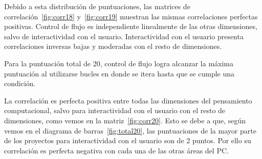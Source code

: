 \documentclass[a4paper, 12pt]{book}
\begin{document}
Debido a esta distribución de puntuaciones, las matrices de correlación~\ref{fig:corr18} y~\ref{fig:corr19} muestran las mismas correlaciones perfectas positivas. Control de flujo es independiente linealmente de las otras dimensiones, salvo de interactividad con el usuario. Interactividad con el usuario presenta correlaciones inversas bajas y moderadas con el resto  de dimensiones.

Para la puntuación total de 20, control de flujo logra alcanzar la máxima puntuación al utilizarse bucles en donde se itera hasta que se cumple una condición.

La correlación es perfecta positiva entre todas las dimensiones del pensamiento computacional, salvo para interactividad con el usuario con el resto de dimensiones, como vemos en la matriz~\ref{fig:corr20}. Esto se debe a que, según vemos en el diagrama de barras~\ref{fig:total20}, las puntuaciones de la mayor parte de los proyectos para interactividad con el usuario son de 2 puntos. Por ello su correlación es perfecta negativa con cada una de las otras áreas del PC. 
\end{document}
